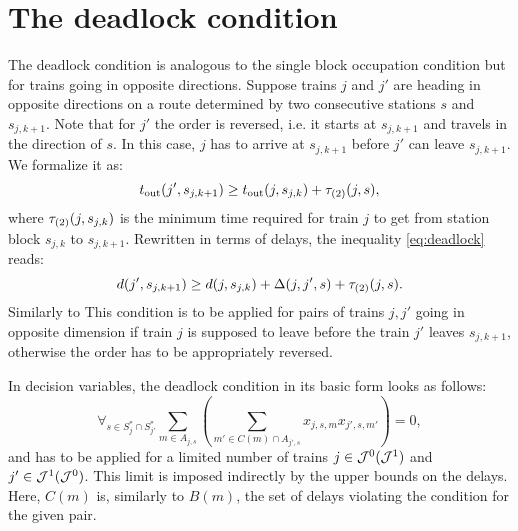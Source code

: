 \section{The deadlock condition}
The deadlock condition is analogous to the single block occupation condition
but for trains going in opposite directions. Suppose trains $j$ and $j'$ are
heading in opposite directions on a route determined by two consecutive
stations $s$ and $s_{j,k+1}$. Note that for $j'$ the order is reversed, i.e. it
starts at $s_{j,k+1}$ and travels in the direction of $s$. In this case, $j$
has to arrive at $s_{j,k+1}$ before $j'$ can leave $s_{j,k+1}$. We formalize it
as:
\begin{equation}
  \label{eq:deadlock}
  t_\text{out}(j', s_{j,k+1}) \ge t_\text{out}(j,s_{j,k}) + \tau_{(2)}(j, s),
\end{equation}
where $\tau_{(2)}(j, s_{j,k})$ is the minimum time required for train $j$ to
get from station block $s_{j,k}$ to $s_{j,k+1}$. Rewritten in terms of delays, the
inequality \eqref{eq:deadlock} reads:
\begin{equation}
  \label{eq:deadlock2}
  d(j',s_{j,k+1}) \ge d(j, s_{j,k}) + \Delta(j,j',s) + \tau_{(2)}(j, s).
\end{equation}
Similarly to
This condition is to be applied for pairs of trains $j,j'$ going in opposite
dimension if train $j$ is supposed to leave before the train $j'$ leaves
$s_{j,k+1}$, otherwise the order has to be appropriately reversed.

In decision variables, the deadlock condition in its basic form looks as
follows:
\begin{equation}
  \label{eq:qubo:deadlock}
  \forall_{s \in S^{*}_{j} \cap S^{*}_{j'}} \sum_{m \in A_{j, s}} \left(
  \sum_{m' \in C(m) \cap A_{j', s}} x_{j,s,m}x_{j',s,m'}
  \right) = 0,
\end{equation}
and has to be applied for a limited number of trains $j \in \mathcal{J}^{0} (\mathcal{J}^{1})$
and $j' \in \mathcal{J}^{1}(\mathcal{J}^{0})$. This limit is imposed indirectly by the upper
bounds on the delays. Here, $C(m)$ is, similarly to $B(m)$, the set of delays
violating the condition for the given pair.
